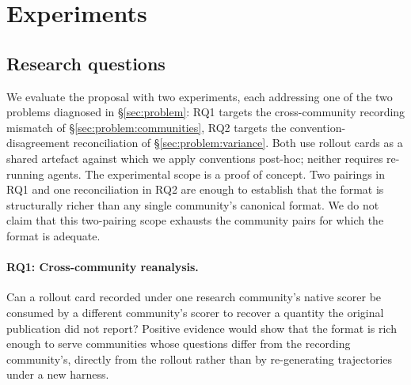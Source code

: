 \documentclass{article}
\newcommand{\expnum}[1]{\textcolor{red}{\textbf{[#1]}}}
\begin{document}
\section{Experiments}
\label{sec:validation}

%
%

\subsection{Research questions}
\label{sec:validation:questions}

We evaluate the proposal with two experiments, each addressing
one of the two problems diagnosed in \S\ref{sec:problem}:
RQ1 targets the cross-community recording mismatch of
\S\ref{sec:problem:communities}, RQ2 targets the
convention-disagreement reconciliation of
\S\ref{sec:problem:variance}. Both use rollout cards as a
shared artefact against which we apply conventions post-hoc;
neither requires re-running agents. The experimental scope is a proof of concept. Two pairings in
RQ1 and one reconciliation in RQ2 are enough to establish that
the format is structurally richer than any single community's
canonical format. We do not claim that this two-pairing scope
exhausts the community pairs for which the format is
adequate.

\paragraph{RQ1: Cross-community reanalysis.} Can a rollout
card recorded under one research community's native scorer be
consumed by a different community's scorer to recover a
quantity the original publication did not report? Positive
evidence would show that the format is rich enough to serve
communities whose questions differ from the recording
community's, directly from the rollout rather than by
re-generating trajectories under a new harness.
\end{document}
